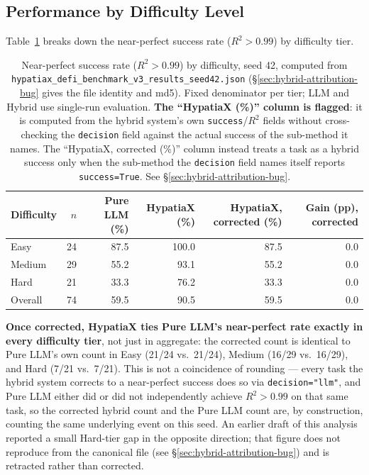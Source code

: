 \documentclass[twoside,11pt]{article}
\newcommand{\Rsq}{R^{2}}
\begin{document}
\subsection{Performance by Difficulty Level}\label{subsec:performance-by-difficulty-level}
\label{sec:difficulty}

Table~\ref{tab:difficulty} breaks down the near-perfect success rate ($\Rsq > 0.99$)
by difficulty tier.

\begin{table}[h]
\centering
\caption{Near-perfect success rate ($\Rsq > 0.99$) by difficulty, seed 42,
computed from \texttt{hypatiax\_defi\_benchmark\_v3\_results\_seed42.json}
(\S\ref{sec:hybrid-attribution-bug} gives the file identity and md5).
Fixed denominator per tier; LLM and Hybrid use single-run evaluation.
\textbf{The ``HypatiaX (\%)'' column is flagged}: it is computed from the
hybrid system's own \texttt{success}/$\Rsq$ fields without cross-checking the
\texttt{decision} field against the actual success of the sub-method it
names. The ``HypatiaX, corrected (\%)'' column instead treats a task as a
hybrid success only when the sub-method the \texttt{decision} field names
itself reports \texttt{success=True}. See \S\ref{sec:hybrid-attribution-bug}.}
\label{tab:difficulty}
\begin{tabular}{lrrrrr}
\toprule
Difficulty & $n$ & Pure LLM (\%) & HypatiaX (\%) & HypatiaX, corrected (\%) & Gain (pp), corrected \\
\midrule
Easy       & 24  & 87.5          & 100.0 & 87.5 & $0.0$ \\
Medium     & 29  & 55.2          & 93.1  & 55.2 & $0.0$ \\
Hard       & 21  & 33.3          & 76.2  & 33.3 & $0.0$ \\
\midrule
Overall    & 74  & 59.5          & 90.5 & 59.5 & $0.0$ \\
\bottomrule
\end{tabular}
\end{table}

\textbf{Once corrected, HypatiaX ties Pure LLM's near-perfect rate exactly in
every difficulty tier}, not just in aggregate: the corrected count is
identical to Pure LLM's own count in Easy (21/24 vs.\ 21/24), Medium (16/29
vs.\ 16/29), and Hard (7/21 vs.\ 7/21). This is not a coincidence of
rounding --- every task the hybrid system corrects to a near-perfect success
does so via \texttt{decision="llm"}, and Pure LLM either did or did not
independently achieve $\Rsq>0.99$ on that same task, so the corrected hybrid
count and the Pure LLM count are, by construction, counting the same
underlying event on this seed. An earlier draft of this analysis reported a
small Hard-tier gap in the opposite direction; that figure does not
reproduce from the canonical file (see \S\ref{sec:hybrid-attribution-bug})
and is retracted rather than corrected.
\end{document}
